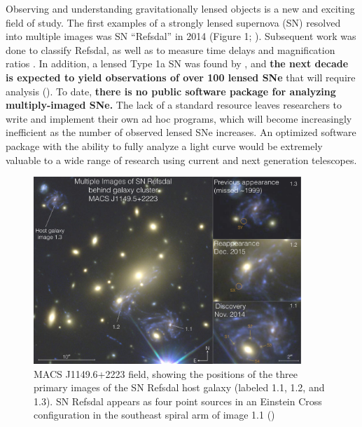 \thispagestyle{fancy}
\lhead{}
\rhead{}
\renewcommand{\headrulewidth}{1pt}
\renewcommand{\footrulewidth}{0pt}
\newcommand{\packageName}{\textit{SNTD}}
\renewcommand{\baselinestretch}{1.5} 

\fancyfoot[C]{}

\pagestyle{fancy}
Observing and understanding gravitationally lensed objects is a new
and exciting field of study. The first examples of a strongly lensed
supernova (SN) resolved into multiple images was SN ``Refsdal'' in
2014 (Figure 1; \citet{Kelly:2015a}). Subsequent work was done to
classify Refsdal, as well as to measure time delays and magnification
ratios \citep{Kelly:2016,Rodney:2016}. In addition, a lensed Type 1a SN was found
by \cite{Goobar:2016}, and \textbf{the next decade is expected to yield observations
of over 100 lensed SNe} that will require analysis (\cite{Oguri:2010}).
To date, \textbf{there is no public software package for analyzing multiply-imaged SNe.}
The lack of a standard resource leaves researchers to write and implement their 
own ad hoc programs, which will become increasingly inefficient as the number of
observed lensed SNe increases. 
An optimized software package with the ability to fully analyze a light curve would be 
extremely valuable to a wide range of
 research using current and next generation telescopes.

\begin{figure}[h]
\centering
\includegraphics[width=0.9\textwidth]{refsdal_rodney.pdf}
\caption{
MACS J1149.6+2223 field, showing the positions of the three primary
images of the SN Refsdal host galaxy (labeled 1.1, 1.2, and 1.3). SN
Refsdal appears as four point sources in an Einstein Cross
configuration in the southeast spiral arm of image 1.1 (\cite{Rodney:2016})}
\end{figure}


